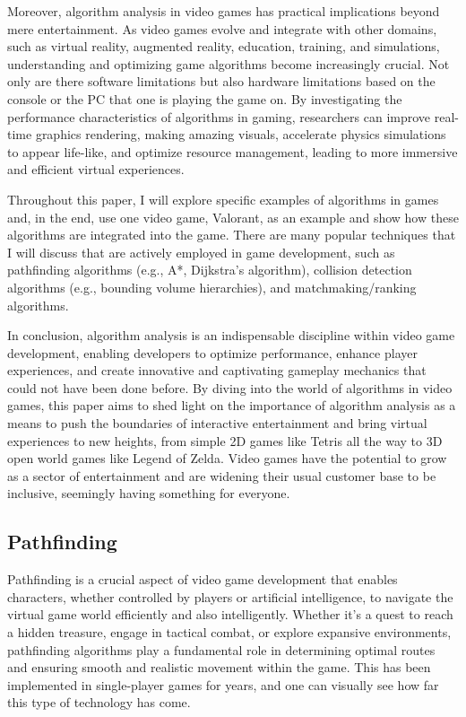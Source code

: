 \documentclass{article}
\theoremstyle{theorem}
\theoremstyle{definition}
\theoremstyle{remark}
\begin{document}
\medskip\indent
Moreover, algorithm analysis in video games has practical implications beyond mere entertainment. As video games evolve and integrate with other domains, such as virtual reality, augmented reality, education, training, and simulations, understanding and optimizing game algorithms become increasingly crucial. Not only are there software limitations but also hardware limitations based on the console or the PC that one is playing the game on.  By investigating the performance characteristics of algorithms in gaming, researchers can improve real-time graphics rendering, making amazing visuals, accelerate physics simulations to appear life-like, and optimize resource management, leading to more immersive and efficient virtual experiences.

\medskip\indent
Throughout this paper, I will explore specific examples of algorithms in games and, in the end, use one video game, Valorant, as an example and show how these algorithms are integrated into the game. There are many popular techniques that I will discuss that are actively employed in game development, such as pathfinding algorithms (e.g., A*, Dijkstra's algorithm), collision detection algorithms (e.g., bounding volume hierarchies), and matchmaking/ranking algorithms.

\medskip\indent
In conclusion, algorithm analysis is an indispensable discipline within video game development, enabling developers to optimize performance, enhance player experiences, and create innovative and captivating gameplay mechanics that could not have been done before. By diving into the world of algorithms in video games, this paper aims to shed light on the importance of algorithm analysis as a means to push the boundaries of interactive entertainment and bring virtual experiences to new heights, from simple 2D games like Tetris all the way to 3D open world games like Legend of Zelda. Video games have the potential to grow as a sector of entertainment and are widening their usual customer base to be inclusive, seemingly having something for everyone.

\subsection{Pathfinding}

\medskip\indent
Pathfinding is a crucial aspect of video game development that enables characters, whether controlled by players or artificial intelligence, to navigate the virtual game world efficiently and also intelligently. Whether it's a quest to reach a hidden treasure, engage in tactical combat, or explore expansive environments, pathfinding algorithms play a fundamental role in determining optimal routes and ensuring smooth and realistic movement within the game. This has been implemented in single-player games for years, and one can visually see how far this type of technology has come.
\end{document}
